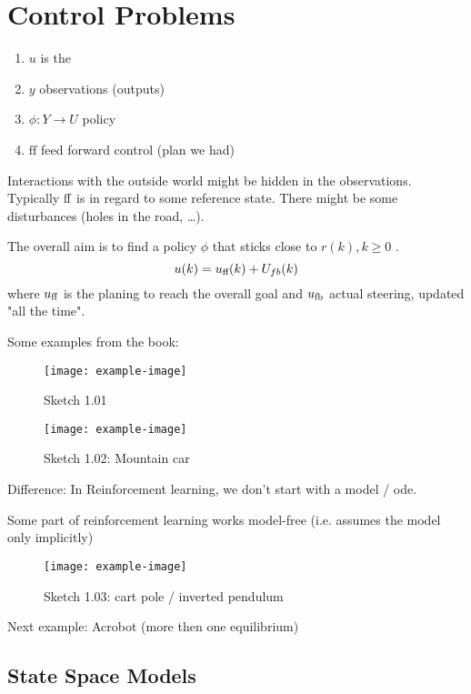 \chapter{Control Problems}

\begin{enumerate}
    \item $u$ is the  
    \item $y$ observations (outputs)
    \item $\phi:Y\to U$ policy
    \item $\text{ff}$ feed forward control (plan we had)
\end{enumerate}

Interactions with the outside world might be hidden in the observations. Typically ${\text{ff}}$ is 
in regard to some reference state. There might be some disturbances (holes in the road, \dots).

The overall aim is to find a policy \(\phi\) that sticks close to $r(k),k\geq 0$ .
\[u(k)=u_{\text{ff}}(k)+U_{fb}(k)\]
where $u_{\text{ff}}$ is the planing to reach the overall goal and $u_{{\text{fb}}}$ actual steering, updated "all the time".

Some examples from the book:

\begin{figure}[H]\label{fig:1.01}
    \centering
    \texttt{[image: example-image]}
    \caption{Sketch 1.01}
\end{figure}

\begin{figure}[H]\label{fig:1.02}
    \centering
    \texttt{[image: example-image]}
    \caption{Sketch 1.02: Mountain car}
\end{figure}

Difference: In Reinforcement learning, we don't start with a model / ode. 

Some part of reinforcement learning works model-free (i.e. assumes the model only implicitly)

\begin{figure}[H]\label{fig:1.03}
    \centering
    \texttt{[image: example-image]}
    \caption{Sketch 1.03: cart pole / inverted pendulum}
\end{figure}

Next example: Acrobot (more then one equilibrium)

\section{State Space Models}

